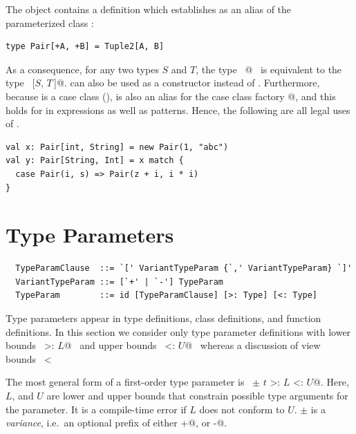 \example The  object contains a definition which establishes  
as an alias of the parameterized class :
\begin{lstlisting}
type Pair[+A, +B] = Tuple2[A, B] 
\end{lstlisting}
As a consequence, for any two types $S$ and $T$, the type
~\lstinline@Pair[$S$, $T\,$]@~ is equivalent to the type ~[$S$, $T\,$]@.
 can also be used as a constructor instead of .
Furthermore, because  is a case class (),
 is also an alias for the case class factory @, and this holds
for in expressions as well as patterns. Hence, the following are all legal uses of \lstinline@Pair@.
\begin{lstlisting}
val x: Pair[int, String] = new Pair(1, "abc")
val y: Pair[String, Int] = x match {
  case Pair(i, s) => Pair(z + i, i * i)
}
\end{lstlisting}

\section{Type Parameters}\label{sec:type-params}

\syntax\begin{lstlisting}
  TypeParamClause  ::= `[' VariantTypeParam {`,' VariantTypeParam} `]'
  VariantTypeParam ::= [`+' | `-'] TypeParam
  TypeParam        ::= id [TypeParamClause] [>: Type] [<: Type]
\end{lstlisting}

Type parameters appear in type definitions, class definitions, and
function definitions.  In this section we consider only type parameter
definitions with lower bounds ~\lstinline@>: $L$@~ and upper bounds
~\lstinline@<: $U$@~ whereas a discussion of view bounds
~\lstinline@<% $U$@~ is deferred to Section~\ref{sec:view-bounds}.

The most general form of a first-order type parameter is ~\lstinline@$\pm$ $t$ >: $L$ <: $U$@.  
Here, $L$, and $U$ are lower and upper bounds that
constrain possible type arguments for the parameter.  It is a
compile-time error if $L$ does not conform to $U$. $\pm$ is a {\em
variance}, i.e.\ an optional prefix of either \lstinline@+@, or
\lstinline@-@.


